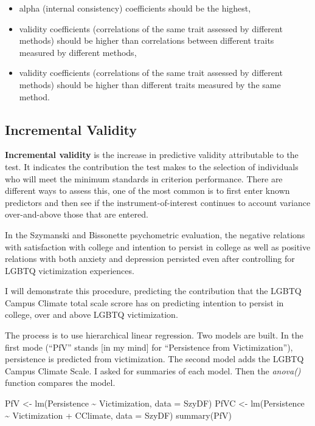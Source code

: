 \documentclass[
  english,
]{book}
\newenvironment{Shaded}{\begin{snugshade}}{\end{snugshade}}
\newcommand{\AttributeTok}[1]{\textcolor[rgb]{0.77,0.63,0.00}{#1}}
\newcommand{\FunctionTok}[1]{\textcolor[rgb]{0.00,0.00,0.00}{#1}}
\newcommand{\NormalTok}[1]{#1}
\newcommand{\OtherTok}[1]{\textcolor[rgb]{0.56,0.35,0.01}{#1}}
\newcommand{\SpecialCharTok}[1]{\textcolor[rgb]{0.00,0.00,0.00}{#1}}
\providecommand{\tightlist}{%
  \setlength{\itemsep}{0pt}\setlength{\parskip}{0pt}}
\begin{document}
\begin{itemize}
\tightlist
\item
  alpha (internal consistency) coefficients should be the highest,
\item
  validity coefficients (correlations of the same trait assessed by different methods) should be higher than correlations between different traits measured by different methods,
\item
  validity coefficients (correlations of the same trait assessed by different methods) should be higher than different traits measured by the same method.
\end{itemize}

\hypertarget{incremental-validity}{%
\subsection{Incremental Validity}\label{incremental-validity}}

\textbf{Incremental validity} is the increase in predictive validity attributable to the test. It indicates the contribution the test makes to the selection of individuals who will meet the minimum standards in criterion performance. There are different ways to assess this, one of the most common is to first enter known predictors and then see if the instrument-of-interest continues to account variance over-and-above those that are entered.

In the Szymanski and Bissonette \citeyearpar{szymanski_perceptions_2020} psychometric evaluation, the negative relations with satisfaction with college and intention to persist in college as well as positive relations with both anxiety and depression persisted even after controlling for LGBTQ victimization experiences.

I will demonstrate this procedure, predicting the contribution that the LGBTQ Campus Climate total scale scrore has on predicting intention to persist in college, over and above LGBTQ victimization.

The process is to use hierarchical linear regression. Two models are built. In the first mode (``PfV'' stands {[}in my mind{]} for ``Persistence from Victimization''), persistence is predicted from victimization. The second model adds the LGBTQ Campus Climate Scale. I asked for summaries of each model. Then the \emph{anova()} function compares the model.

\begin{Shaded}
\begin{Highlighting}[]
\NormalTok{PfV }\OtherTok{\textless{}{-}} \FunctionTok{lm}\NormalTok{(Persistence }\SpecialCharTok{\textasciitilde{}}\NormalTok{ Victimization, }\AttributeTok{data =}\NormalTok{ SzyDF)}
\NormalTok{PfVC }\OtherTok{\textless{}{-}} \FunctionTok{lm}\NormalTok{(Persistence }\SpecialCharTok{\textasciitilde{}}\NormalTok{ Victimization }\SpecialCharTok{+}\NormalTok{ CClimate, }\AttributeTok{data =}\NormalTok{ SzyDF)}
\FunctionTok{summary}\NormalTok{(PfV)}
\end{Highlighting}
\end{Shaded}
\end{document}
